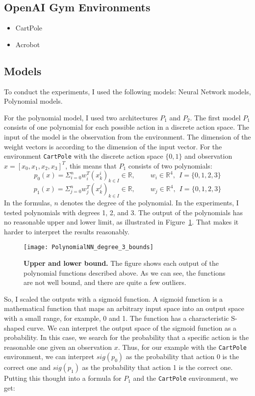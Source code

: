 \subsection{OpenAI Gym Environments}
\begin{itemize}
  \item CartPole
  \item Acrobot
\end{itemize}

\subsection{Models}
\label{ssec:models}
To conduct the experiments, I used the following models: Neural Network models, Polynomial models.

For the polynomial model, I used two architectures $P_1$ and $P_2$. The first model $P_1$ consists of one polynomial for each possible action in a discrete action space. The input of the model is the observation from the environment. The dimension of the weight vectors is according to the dimension of the input vector. For the environment \verb|CartPole| with the discrete action space $\{0, 1\}$ and observation $x = [x_0, x_1, x_2, x_3]^T$, this means that $P_1$ consists of two polynomials:
\[
  p_0(x) = \Sigma_{i=0}^{n} w_i^T (x_k^i)_{k \in I} \in \mathbb{R}, \ \ \ \ \ \ \ \ \ \ w_i \in \mathbb{R}^4, \ \ I = \{0, 1, 2, 3\}
\]
\[
  p_1(x) = \Sigma_{j=0}^{n} w_j^T (x_k^j)_{k \in I} \in \mathbb{R}, \ \ \ \ \ \ \ \ \ \ w_j \in \mathbb{R}^4, \ \ I = \{0, 1, 2, 3\}
\]
In the formulas, $n$ denotes the degree of the polynomial. In the experiments, I tested polynomials with degrees 1, 2, and 3. The output of the polynomials has no reasonable upper and lower limit, as illustrated in Figure~\ref{fig:bounds}. That makes it harder to interpret the results reasonably.
\begin{figure}[ht]
\centering
\texttt{[image: PolynomialNN\_degree\_3\_bounds]}
\caption[Upper and lower bound]{
  \textbf{Upper and lower bound.}
  The figure shows each output of the polynomial functions described above. As we can see, the functions are not well bound, and there are quite a few outliers.
}
\label{fig:bounds}
\end{figure}
So, I scaled the outputs with a sigmoid function. A sigmoid function is a mathematical function that maps an arbitrary input space into an output space with a small range, for example, 0 and 1. The function has a characteristic S-shaped curve. We can interpret the output space of the sigmoid function as a probability. In this case, we search for the probability that a specific action is the reasonable one given an observation $x$. Thus, for our example with the \verb|CartPole| environment, we can interpret $sig(p_0)$ as the probability that action 0 is the correct one and $sig(p_1)$ as the probability that action 1 is the correct one. Putting this thought into a formula for $P_1$ and the \verb|CartPole| environment, we get:
